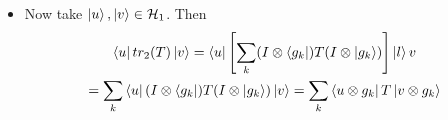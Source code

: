 \documentclass[a4paper, 11pt]{article}
\begin{document}
{\begin{itemize}
\begin{align*}
			tr_2(T) & = tr_2\lt( \sum\limits_{i,j}\gm_{i,j}A_i\tensor B_j \rt)=\sum\limits_{i,j}\gm_{i,j}tr_2(A_i\tensor B_j)\\
			& = \sum\limits_{i,j}\gm_{i,j}A_i tr( B_j)\\
			& = \sum_{i,j}A_i\sum_k\bra{g_k}B_j\ket{g_k}\\
			& = \sum_{i,j}\sum_k\gm_{i,j}(I\tensor \bra{g_k})A_i\tensor B_j(I\tensor \ket{g_K})\\
			& = \sum_k(I\tensor \bra{g_k})\lt[ \sum_{i,j}\gm_{i,j}A_i\tensor B_j\rt](I\tensor \ket{g_K})\\
			& = \sum_k(I\tensor \bra{g_k})T(I\tensor \ket{g_k})
		\end{align*}So if we get two different representations of $T$, $T=\sum\limits_{i,j}\gm_{i,j}A_i\tensor B_j$ and $T=\sum\limits_{i,j}\gm'_{i,j}A_i'\tensor B_j'$ still for each of them $tr_2(T)$ will be same since it doesn't matter which representation is finally taken. Therefore $tr_2(T)$ is well defined.
		\item  Now take $\ket{u},\ket{v}\in \mathcal{H}_1$. Then \begin{multline*}
			\bra{u}tr_2(T)\ket{v}=\bra{u}\left[\sum_k(I\otimes \bra{g_k})T(I\otimes \ket{g_k}) \right]\ket l{v}\\
			= \sum_k\bra{u}(I\otimes \bra{g_k})T(I\otimes \ket{ g_k})\ket{v}=\sum_k\bra{u\otimes g_k}T \ket{v\otimes g_k}
		\end{multline*}
	\end{itemize}
}

\end{document}
